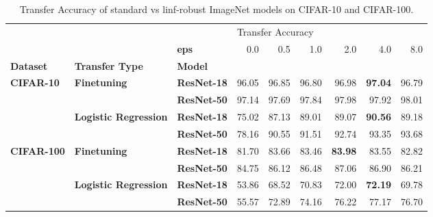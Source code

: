 \begin{table}
\centering
\caption{Transfer Accuracy of standard vs linf-robust ImageNet models on CIFAR-10 and CIFAR-100.}
\label{app:small-datasets-linf}
\begin{tabular}{lllrrrrrr}
\toprule
          &                     & {} & \multicolumn{6}{l}{Transfer Accuracy} \\
          &                     & \textbf{eps} &               0.0 &   0.5 &   1.0 &   2.0 &   4.0 &   8.0 \\
\textbf{Dataset} & \textbf{Transfer Type} & \textbf{Model} &                   &       &       &       &       &       \\
\midrule
\multirow{4}{*}{\textbf{CIFAR-10}} & \multirow{2}{*}{\textbf{Finetuning}} & \textbf{ResNet-18} &             96.05 & 96.85 & 96.80 & 96.98 & \textbf{97.04} & 96.79 \\
          &                     & \textbf{ResNet-50} &             97.14 & 97.69 & 97.84 & 97.98 & 97.92 & 98.01 \\
\cline{2-9}
          & \multirow{2}{*}{\textbf{Logistic Regression}} & \textbf{ResNet-18} &             75.02 & 87.13 & 89.01 & 89.07 & \textbf{90.56} & 89.18 \\
          &                     & \textbf{ResNet-50} &             78.16 & 90.55 & 91.51 & 92.74 & 93.35 & 93.68 \\
\cline{1-9}
\cline{2-9}
\multirow{4}{*}{\textbf{CIFAR-100}} & \multirow{2}{*}{\textbf{Finetuning}} & \textbf{ResNet-18} &             81.70 & 83.66 & 83.46 & \textbf{83.98} & 83.55 & 82.82 \\
          &                     & \textbf{ResNet-50} &             84.75 & 86.12 & 86.48 & 87.06 & 86.90 & 86.21 \\
\cline{2-9}
          & \multirow{2}{*}{\textbf{Logistic Regression}} & \textbf{ResNet-18} &             53.86 & 68.52 & 70.83 & 72.00 & \textbf{72.19} & 69.78 \\
          &                     & \textbf{ResNet-50} &             55.57 & 72.89 & 74.16 & 76.22 & 77.17 & 76.70 \\
\bottomrule
\end{tabular}
\end{table}
